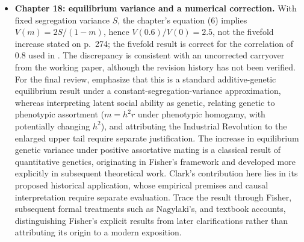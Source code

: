 \begin{itemize}
Supporting qualifications: genetic additivity alone does not guarantee
an exactly linear conditional mean; linearity, contraction and symmetry
about a common population mean require distinct assumptions; the high
reported $R^2$ values for grouped means are not individual-level
explanatory power or formal tests against nonlinearities; and symmetry
of log deviations is not equality of ordinary percentage changes.
Keep these qualifications subordinate to the identification criticism.
The source-checked quotations, graphical slope estimates, identity-line
replots and mathematical counterexamples are saved in the
Chapter~14 audit dated 23 September 2026 in the project notes.

\item \textbf{Chapter 18: equilibrium variance and a numerical correction.}
With fixed segregation variance $S$, the chapter's equation (6) implies
$V(m)=2S/(1-m)$, hence $V(0.6)/V(0)=2.5$, not the fivefold increase
stated on p.~274; the fivefold result is correct for the correlation
of $0.8$ used in \citet[pp.~3--4]{ClarkCummins2022}.
The discrepancy is consistent with an uncorrected carryover from the
working paper, although the revision history has not been verified.
For the final review, emphasize that this is a standard additive-genetic
equilibrium result under a constant-segregation-variance approximation,
whereas interpreting latent social ability as genetic, relating genetic
to phenotypic assortment ($m=h^2r$ under phenotypic homogamy, with
potentially changing $h^2$), and attributing the Industrial Revolution
to the enlarged upper tail require separate justification.
The increase in equilibrium genetic variance under positive assortative
mating is a classical result of quantitative genetics, originating in
Fisher's framework and developed more explicitly in subsequent theoretical
work. Clark's contribution here lies in its proposed historical application,
whose empirical premises and causal interpretation require separate
evaluation. Trace the result through Fisher, subsequent formal treatments
such as Nagylaki's, and textbook accounts, distinguishing Fisher's explicit
results from later clarifications rather than attributing its origin to
a modern exposition.


\end{itemize}

